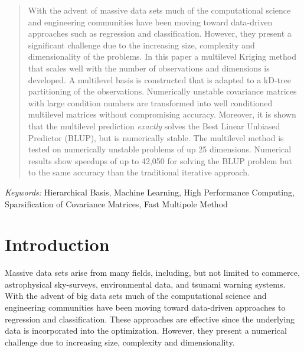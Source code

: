 \documentclass[11pt,final]{amsart}       %
\begin{document}
\begin{abstract}
With the advent of massive data sets much of the computational science
and engineering communities have been moving toward data-driven
approaches such as regression and classification. However, they
present a significant challenge due to the increasing size, complexity
and dimensionality of the problems.  In this paper a multilevel
Kriging method that scales well with the number of observations and
dimensions is developed.  A multilevel basis is constructed that is
adapted to a kD-tree partitioning of the observations.  Numerically
unstable covariance matrices with large condition numbers are
transformed into well conditioned multilevel matrices without
compromising accuracy. Moreover, it is shown that the multilevel
prediction \emph{exactly} solves the Best Linear Unbiased Predictor
(BLUP), but is numerically stable.  The multilevel method is tested on
numerically unstable problems of up 25 dimensions. Numerical results
show speedups of up to 42,050 for solving the BLUP problem but to the
same accuracy than the traditional iterative approach.
\end{abstract}



\maketitle

\noindent
    {\it Keywords:} Hierarchical Basis, Machine Learning, High
    Performance Computing, Sparsification of Covariance Matrices, Fast
    Multipole Method

    









\section{Introduction}






Massive data sets arise from many fields, including, but not limited
to commerce, astrophysical sky-surveys, environmental data, and tsunami
warning systems.  With the advent of big data sets much of the
computational science and engineering communities have been moving
toward data-driven approaches to regression and classification. These
approaches are effective since the underlying data is incorporated
into the optimization. However, they present a numerical challenge due
to increasing size, complexity and dimensionality.
\end{document}
